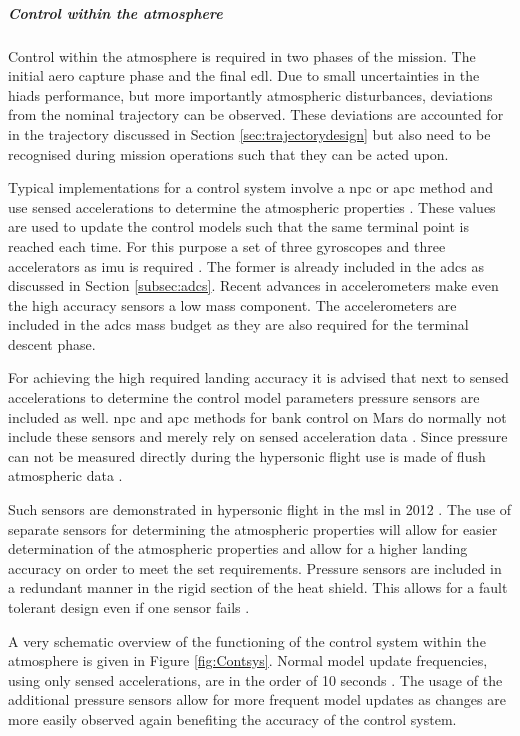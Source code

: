\subparagraph{Control within the atmosphere}

Control within the atmosphere is required in two phases of the mission. The initial aero capture phase and the final \gls{edl}. Due to small uncertainties in the \glspl{hiad} performance, but more importantly atmospheric disturbances, deviations from the nominal trajectory can be observed. These deviations are accounted for in the trajectory discussed in Section \ref{sec:trajectorydesign} but also need to be recognised during mission operations such that they can be acted upon. 

Typical implementations for a control system involve a \gls{npc} or \gls{apc} method and use sensed accelerations to determine the atmospheric properties \cite{Davis2010}. These values are used to update the control models such that the same terminal point is reached each time. For this purpose a set of three gyroscopes and three accelerators as \gls{imu} is required \cite{Dutta2013}. The former is already included in the \gls{adcs} as discussed in Section \ref{subsec:adcs}. Recent advances in accelerometers make even the high accuracy sensors a low mass component. The accelerometers are included in the \gls{adcs} mass budget as they are also required for the terminal descent phase. 

For achieving the high required landing accuracy it is advised that next to sensed accelerations to determine the control model parameters pressure sensors are included as well.  \gls{npc} and \gls{apc} methods for bank control on Mars do normally not include these sensors and merely rely on sensed acceleration data \cite{Lu2007, Davis2010}. Since pressure can not be measured directly during the hypersonic flight use is made of flush atmospheric data \cite{Dutta2013}. 
 
Such sensors are demonstrated in hypersonic flight in the \gls{msl} in 2012 \cite{Dutta2013}. The use of separate sensors for determining the atmospheric properties will allow for easier determination of the atmospheric properties and allow for a higher landing accuracy on order to meet the set requirements.
Pressure sensors are included in a redundant manner in the rigid section of the heat shield. This allows for a fault tolerant design even if one sensor fails \cite{Whitmore1995}. 

A very schematic overview of the functioning of the control system within the atmosphere is given in Figure \ref{fig:Contsys}. Normal model update frequencies, using only sensed accelerations, are in the order of 10 seconds \cite{Davis2010}. The usage of the additional pressure sensors allow for more frequent model updates as changes are more easily observed again benefiting the accuracy of the control system.

